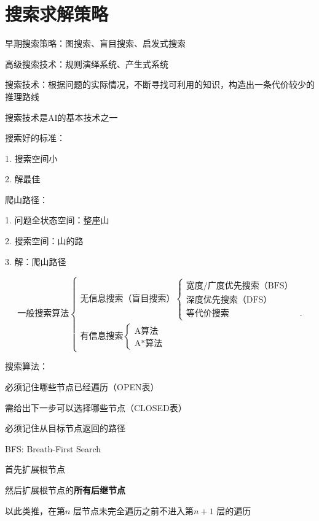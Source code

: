 \section{搜索求解策略}%
\label{sec:搜索求解策略}
\begin{notation}
    早期搜索策略：图搜索、盲目搜索、启发式搜索

    高级搜索技术：规则演绎系统、产生式系统
\end{notation}
\begin{defi}
    搜索技术：根据问题的实际情况，不断寻找可利用的知识，构造出一条代价较少的推理路线

    搜索技术是AI的基本技术之一
\end{defi}
搜索好的标准：

1. 搜索空间小

2. 解最佳
\begin{eg}
    爬山路径：

    1. 问题全状态空间：整座山

    2. 搜索空间：山的路

    3. 解：爬山路径
\end{eg}
\[
    \text{一般搜索算法}
    \begin{cases}
        \text{无信息搜索（盲目搜索）}\begin{cases}
            \text{宽度/广度优先搜索（BFS）}\\
            \text{深度优先搜索（DFS）}\\
            \text{等代价搜索}
        \end{cases}\\
        \text{有信息搜索}\begin{cases}
            \text{A算法}\\
            \text{A*算法}
        \end{cases}
    \end{cases}
.\] 
\begin{notation}
    搜索算法：

    必须记住哪些节点已经遍历（OPEN表）

    需给出下一步可以选择哪些节点（CLOSED表）

    必须记住从目标节点返回的路径
\end{notation}
\begin{notation}
    BFS: Breath-First Search

    首先扩展根节点

    然后扩展根节点的\textbf{所有后继节点}

    以此类推，在第$n$ 层节点未完全遍历之前不进入第$n+1$ 层的遍历
\end{notation}

